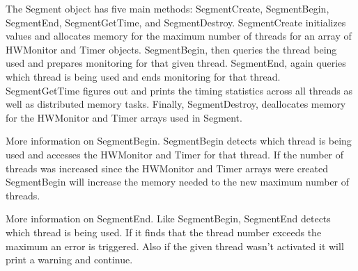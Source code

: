 %


The Segment object has five main methods: SegmentCreate, SegmentBegin, SegmentEnd,
SegmentGetTime, and SegmentDestroy. SegmentCreate initializes values and
allocates memory for the maximum number of threads for an array of HWMonitor and Timer
objects. SegmentBegin, then queries the thread being used and prepares
monitoring for that given thread. SegmentEnd, again queries which thread is
being used and ends monitoring for that thread. SegmentGetTime figures out and
prints the timing statistics across all threads as well as distributed memory
tasks. Finally, SegmentDestroy, deallocates memory for the HWMonitor and
Timer arrays used in Segment.

More information on SegmentBegin. SegmentBegin detects which thread is being
used and accesses the HWMonitor and Timer for that thread. If the number
of threads was increased since the HWMonitor and Timer arrays were created
SegmentBegin will increase the memory needed to the new maximum number of
threads.

More information on SegmentEnd. Like SegmentBegin, SegmentEnd detects which
thread is being used. If it finds that the thread number exceeds the maximum
an error is triggered. Also if the given thread wasn't activated it will 
print a warning and continue.

